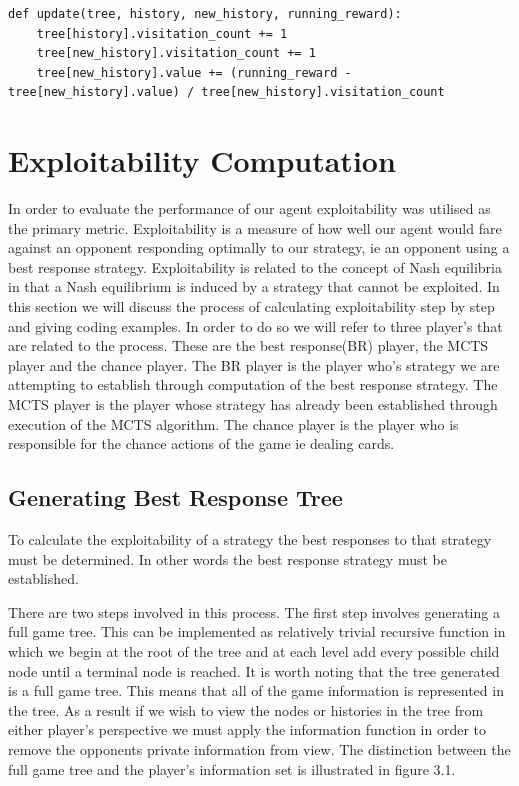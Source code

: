 \begin{lstlisting}[style=Python]
def update(tree, history, new_history, running_reward):
    tree[history].visitation_count += 1
    tree[new_history].visitation_count += 1
    tree[new_history].value += (running_reward - tree[new_history].value) / tree[new_history].visitation_count
\end{lstlisting}


\section{Exploitability Computation}\label{sec:bestResponseComputation}
In order to evaluate the performance of our agent exploitability was utilised as the primary metric.
Exploitability is a measure of how well our agent would fare against an opponent responding
optimally to our strategy, ie an opponent using a best response strategy.
Exploitability is related to the concept of Nash equilibria in that a Nash equilibrium
is induced by a strategy that cannot be exploited.
In this section we will discuss the process of calculating exploitability step by step and giving coding examples.
In order to do so we will refer to three player's that are related to the process.
These are the best response(BR) player, the MCTS player and the chance player.
The BR player is the player who's strategy we are attempting to establish through computation
of the best response strategy.
The MCTS player is the player whose strategy has already been established through execution of the MCTS algorithm.
The chance player is the player who is responsible for the chance actions of the game ie dealing cards.

\subsection{Generating Best Response Tree}\label{subsec:applyMCTS}
To calculate the exploitability of a strategy the best responses to that strategy must be
determined.
In other words the best response strategy must be established.

There are two steps involved in this process.
The first step involves generating a full game tree.
This can be implemented as relatively trivial recursive function in which we begin at the root of the
tree and at each level add every possible child node until a terminal node is reached.
It is worth noting that the tree generated is a full game tree.
This means that all of the game information is represented in the tree.
As a result if we wish to view the nodes or histories in the tree from either player's perspective we must apply
the information function in order to remove the opponents private information from view.
The distinction between the full game tree and the player's information set is illustrated
in figure 3.1.


